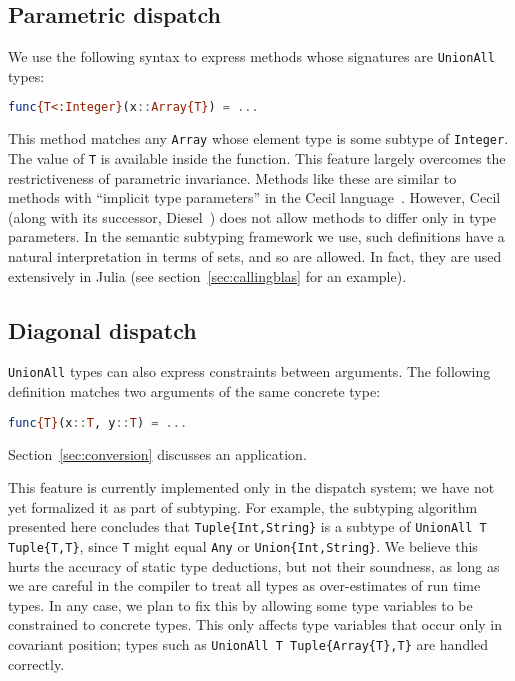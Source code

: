 \subsection{Parametric dispatch}

We use the following syntax to express methods whose signatures
are \texttt{UnionAll} types:

\begin{singlespace}
\begin{lstlisting}[language=julia]
func{T<:Integer}(x::Array{T}) = ...
\end{lstlisting}
\end{singlespace}

\noindent
This method matches any \texttt{Array} whose element type is some subtype
of \texttt{Integer}.
The value of \texttt{T} is available inside the function.
This feature largely overcomes the restrictiveness of parametric invariance.
Methods like these are similar to methods with ``implicit type parameters''
in the Cecil language~\cite{cecilspec}.
However, Cecil (along with its successor, Diesel~\cite{chambers2006diesel})
does not allow methods to differ only in type parameters.
In the semantic subtyping framework we use, such definitions have a
natural interpretation in terms of sets, and so are allowed.
In fact, they are used extensively in Julia (see section~\ref{sec:callingblas}
for an example).

\subsection{Diagonal dispatch}
\label{sec:diagonal}

\texttt{UnionAll} types can also express constraints between arguments.
The following definition matches two arguments of the same concrete
type:

\begin{singlespace}
\begin{lstlisting}[language=julia]
func{T}(x::T, y::T) = ...
\end{lstlisting}
\end{singlespace}

\noindent
Section~\ref{sec:conversion} discusses an application.

This feature is currently implemented only in the dispatch system;
we have not yet formalized it as part of subtyping.
For example, the subtyping algorithm presented here concludes that
\texttt{Tuple\{Int,String\}} is a subtype of
\texttt{UnionAll T Tuple\{T,T\}}, since \texttt{T} might equal
\texttt{Any} or \texttt{Union\{Int,String\}}.
We believe this hurts the accuracy of static type deductions, but
not their soundness, as long as we are careful in the compiler to
treat all types as over-estimates of run time types.
In any case, we plan to fix this by allowing some type variables
to be constrained to concrete types.
This only affects type variables that occur only in covariant
position; types such as \texttt{UnionAll T Tuple\{Array\{T\},T\}}
are handled correctly.

